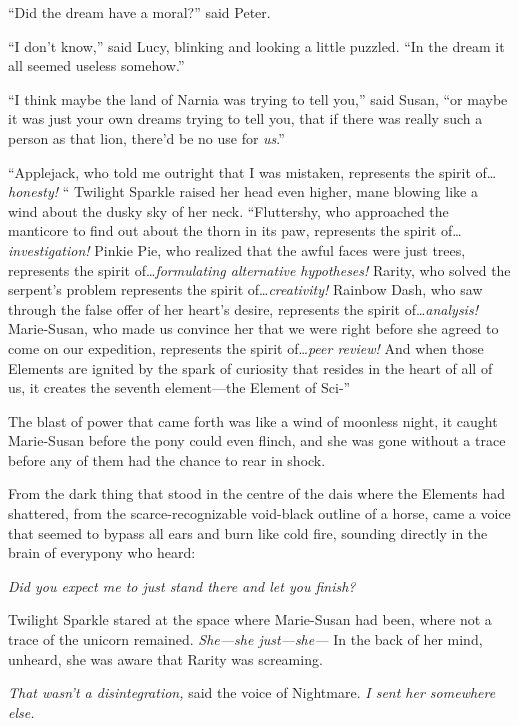 “Did the dream have a moral?” said Peter.

“I don’t know,” said Lucy, blinking and looking a little puzzled. “In the dream it all seemed useless somehow.”

“I think maybe the land of Narnia was trying to tell you,” said Susan, “or maybe it was just your own dreams trying to tell you, that if there was really such a person as that lion, there’d be no use for \emph{us}.”

“Applejack, who told me outright that I was mistaken, represents the spirit of…\emph{honesty!} “ Twilight Sparkle raised her head even higher, mane blowing like a wind about the dusky sky of her neck. “Fluttershy, who approached the manticore to find out about the thorn in its paw, represents the spirit of…\emph{investigation!} Pinkie Pie, who realized that the awful faces were just trees, represents the spirit of…\emph{formulating alternative hypotheses!} Rarity, who solved the serpent’s problem represents the spirit of…\emph{creativity!} Rainbow Dash, who saw through the false offer of her heart’s desire, represents the spirit of…\emph{analysis!} Marie-Susan, who made us convince her that we were right before she agreed to come on our expedition, represents the spirit of…\emph{peer review!} And when those Elements are ignited by the spark of curiosity that resides in the heart of all of us, it creates the seventh element—the Element of Sci-”

The blast of power that came forth was like a wind of moonless night, it caught Marie-Susan before the pony could even flinch, and she was gone without a trace before any of them had the chance to rear in shock.

From the dark thing that stood in the centre of the dais where the Elements had shattered, from the scarce-recognizable void-black outline of a horse, came a voice that seemed to bypass all ears and burn like cold fire, sounding directly in the brain of everypony who heard:

\emph{Did you expect me to just stand there and let you finish?}

Twilight Sparkle stared at the space where Marie-Susan had been, where not a trace of the unicorn remained. \emph{She—she just—she—} In the back of her mind, unheard, she was aware that Rarity was screaming.

\emph{That wasn’t a disintegration,} said the voice of Nightmare. \emph{I sent her somewhere else.}

